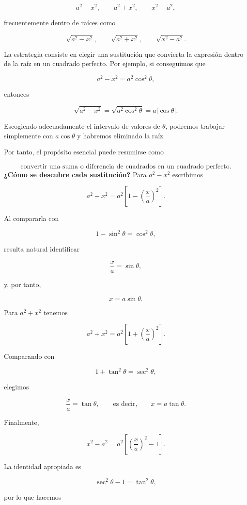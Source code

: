 \documentclass[12pt]{article}
\theoremstyle{definition}
\theoremstyle{remark}
\begin{document}
\[
\boxed{a^2-x^2},\qquad
\boxed{a^2+x^2},\qquad
\boxed{x^2-a^2},
\]

frecuentemente dentro de raíces como

\[
\sqrt{a^2-x^2},\qquad
\sqrt{a^2+x^2},\qquad
\sqrt{x^2-a^2}.
\]

La estrategia consiste en elegir una sustitución que convierta la expresión
dentro de la raíz en un cuadrado perfecto. Por ejemplo, si conseguimos que

\[
a^2-x^2=a^2\cos^2\theta,
\]

entonces

\[
\sqrt{a^2-x^2}=\sqrt{a^2\cos^2\theta}=a|\cos\theta|.
\]

Escogiendo adecuadamente el intervalo de valores de $\theta$, podremos
trabajar simplemente con $a\cos\theta$ y habremos eliminado la raíz.

Por tanto, el propósito esencial puede resumirse como

\[
\boxed{\text{convertir una suma o diferencia de cuadrados en un cuadrado perfecto}.}
\]
\textbf{¿Cómo se descubre cada sustitución?}
Para $a^2-x^2$ escribimos

\[
a^2-x^2=a^2\left[1-\left(\frac{x}{a}\right)^2\right].
\]

Al compararla con

\[
1-\sin^2\theta=\cos^2\theta,
\]

resulta natural identificar

\[
\frac{x}{a}=\sin\theta,
\]

y, por tanto,

\[
\boxed{x=a\sin\theta}.
\]

Para $a^2+x^2$ tenemos

\[
a^2+x^2=a^2\left[1+\left(\frac{x}{a}\right)^2\right].
\]

Comparando con

\[
1+\tan^2\theta=\sec^2\theta,
\]

elegimos

\[
\frac{x}{a}=\tan\theta,
\qquad\text{es decir,}\qquad
\boxed{x=a\tan\theta}.
\]

Finalmente,

\[
x^2-a^2=a^2\left[\left(\frac{x}{a}\right)^2-1\right].
\]

La identidad apropiada es

\[
\sec^2\theta-1=\tan^2\theta,
\]

por lo que hacemos
\end{document}
